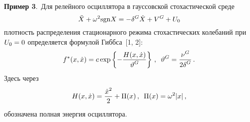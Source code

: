 \begin{multicols}{2}
\medskip

\noindent
\textbf{Пример 3}.\  Для релейного осциллятора в гауссовской стохастической среде
\begin{equation}
\ddot X + \omega^2 {\mathrm{sgn}} X = -\delta^G \dot X + V^G + U_0\label{e7.11-sin}
\end{equation}
плотность распределения стационарного режима стохастических колебаний при $U_0\hm=0$ 
определяется формулой Гиббса~[1, 2]:
\begin{equation}
f^* (x,\dot x) = c \exp \left\{ - 
    \displaystyle\frac{\displaystyle H(x,\dot x)\mathstrut}{\displaystyle \vartheta^G\mathstrut}\right\}\,,\enskip \vartheta^G = 
    \displaystyle\frac{\displaystyle \nu^G\mathstrut}{\displaystyle  2\delta^G\mathstrut}\,.\label{e7.12-sin}
    \end{equation}
Здесь через
\begin{equation*}
H(x,\dot x) = \fr{\dot x^2}{2} +\Pi(x)\,,\enskip \Pi (x) =\w^2 |x|\,, %
\end{equation*}
обозначена полная энергия осциллятора.


\end{multicols}
